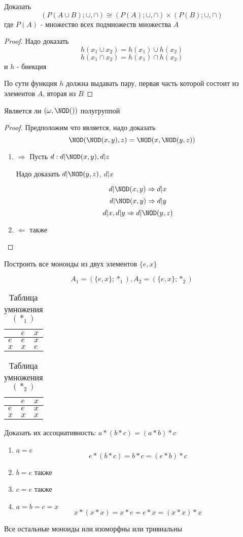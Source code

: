 \documentclass[../main/document.tex]{subfiles}
\begin{document}
\begin{exm}
Доказать
$$(P(A\cup B);\cup,\cap)\cong (P(A);\cup,\cap)\times (P(B);\cup,\cap)$$
где $P(A)$ - множество всех подмножеств множества $A$
\begin{proof}
Надо доказать
$$h(x_1\cup x_2)=h(x_1)\cup h(x_2)$$
$$h(x_1\cap x_2)=h(x_1)\cap h(x_2)$$
и $h$ - биекция

По сути функция $h$ должна выдавать пару, первая часть которой состоит из элементов $A$, вторая из $B$
\end{proof}
\end{exm}
\begin{exm}
Является ли $(\omega,\NOD())$ полугруппой
\begin{proof}
Предположим что является, надо доказать
$$\NOD(\NOD(x,y),z)=\NOD(x,\NOD(y,z))$$
\begin{enumerate}
\item $\Rightarrow$
Пусть $d: d|\NOD(x,y), d|z$

Надо доказать $d|\NOD(y,z)$, $d|x$

$$d|\NOD(x,y)\Rightarrow d|x$$
$$d|\NOD(x,y)\Rightarrow d|y$$
$$d|x,d|y\Rightarrow d|\NOD(y,z)$$
\item $\Leftarrow$ также
\end{enumerate}
\end{proof}
\end{exm}
\begin{exm}
Построить все моноиды из двух элементов $\{e,x\}$

$$A_1=(\{e,x\};*_1), A_2=(\{e,x\};*_2)$$

\begin{table}[h]
\centering
\caption*{Таблица умножения $(*_1)$}
\renewcommand*{\arraystretch}{1.4}
\begin{tabular}{|l|l|l|}
\hline
  & $e$ & $x$  \\ \hline
$e$ & $e$ & $x$  \\ \hline
$x$ & $x$ & $e$ \\ 
\hline
\end{tabular}
\end{table}

\begin{table}[h]
\centering
\caption*{Таблица умножения $(*_2)$}
\renewcommand*{\arraystretch}{1.4}
\begin{tabular}{|l|l|l|}
\hline
  & $e$ & $x$  \\ \hline
$e$ & $e$ & $x$  \\ \hline
$x$ & $x$ & $x$ \\ 
\hline
\end{tabular}
\end{table}

Доказать их ассоциативность: $a*(b*c)=(a*b)*c$
\begin{enumerate}
\item $a=e$
$$e*(b*c)=b*c=(e*b)*c$$
\item $b=e$ также
\item $c=e$ также
\item $a=b=c=x$
$$x*(x*x)=x*e=e*x=(x*x)*x$$
\end{enumerate}
Все остальные моноиды или изоморфны или тривиальны
\end{exm}
\end{document}
